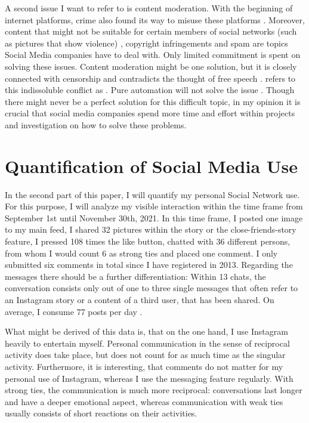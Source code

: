 \documentclass[11pt,letterpaper]{article}
\begin{document}
A second issue I want to refer to is content moderation. With the beginning of internet platforms, crime also found its way to misuse these platforms \autocite[][]{Gupta.2021}. Moreover, content that might not be suitable for certain members of social networks (such as pictures that show violence) \autocite[][pp. 225 - 226]{Mengu.2015}, copyright infringements \autocite[][]{Hegemann.2019} and spam \autocite[][p. 1458]{Jin.2011} are topics Social Media companies have to deal with. Only limited commitment is spent on solving these issues. Content moderation might be one solution, but it is closely connected with censorship and contradicts the thought of free speech \autocite[][p. 1359]{Langvardt.2017}. \cite{Langvardt.2017} refers to this indissoluble conflict as . Pure automation will not solve the issue \autocite[][pp. 3 - 4]{Gillespie.2020}. Though there might never be a perfect solution for this difficult topic, in my opinion it is crucial that social media companies spend more time and effort within projects and investigation on how to solve these problems. 


\section*{Quantification of Social Media Use}
In the second part of this paper, I will quantify my personal Social Network use. For this purpose, I will analyze my visible interaction within the time frame from September 1st until November 30th, 2021. In this time frame, I posted one image to my main feed, I shared 32 pictures within the story or the close-friends-story feature, I pressed 108 times the like button, chatted with 36 different persons, from whom I would count 6 as strong ties and placed one comment. I only submitted six comments in total since I have registered in 2013. Regarding the messages there should be a further differentiation: Within 13 chats, the conversation consists only out of one to three single messages that often refer to an Instagram story or a content of a third user, that has been shared. On average, I consume 77 posts per day \autocite[whole paragraph:][]{Instagram.2021}. 

What might be derived of this data is, that on the one hand, I use Instagram heavily to entertain myself. Personal communication in the sense of reciprocal activity does take place, but does not count for as much time as the singular activity. Furthermore, it is interesting, that comments do not matter for my personal use of Instagram, whereas I use the messaging feature regularly. With strong ties, the communication is much more reciprocal: conversations last longer and have a deeper emotional aspect, whereas communication with weak ties usually consists of short reactions on their activities.
\end{document}
